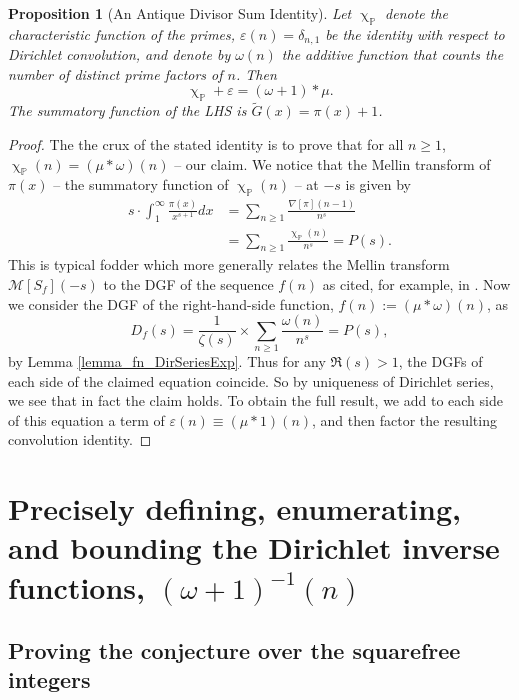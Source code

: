 \documentclass[11pt,reqno,a4letter]{article}
\numberwithin{figure}{section}
\numberwithin{table}{section}
\renewcommand{\chi}{\upchi}
\theoremstyle{plain}
\newtheorem{prop}[theorem]{Proposition}
\numberwithin{theorem}{section}
\theoremstyle{definition}
\begin{document}
\begin{prop}[An Antique Divisor Sum Identity] 
\label{prop_AntiqueDivisorSumIdent} 
Let $\chi_{\mathbb{P}}$ denote the characteristic function of the primes, 
$\varepsilon(n) = \delta_{n,1}$ be the identity with respect to Dirichlet convolution, 
and denote by $\omega(n)$ the additive function that counts the number of 
distinct prime factors of $n$. 
Then 
$$\chi_{\mathbb{P}} + \varepsilon = (\omega + 1) \ast \mu.$$ 
The summatory function of the LHS is $\widetilde{G}(x) = \pi(x)+1$.
\end{prop}
\begin{proof} 
The the crux of the stated identity is to prove that for all $n \geq 1$, 
$\chi_{\mathbb{P}}(n) = (\mu \ast \omega)(n)$ -- our claim. 
We notice that the Mellin transform of $\pi(x)$ -- the summatory function of 
$\chi_{\mathbb{P}}(n)$ -- at $-s$ is given by 
\begin{align*} 
s \cdot \int_1^{\infty} \frac{\pi(x)}{x^{s+1}} dx & = \sum_{n \geq 1} \frac{\nabla[\pi](n-1)}{n^s} \\ 
     & = \sum_{n \geq 1} \frac{\chi_{\mathbb{P}}(n)}{n^s} = P(s). 
\end{align*} 
This is typical fodder which more generally relates the Mellin transform $\mathcal{M}[S_f](-s)$ to the 
DGF of the sequence $f(n)$ as cited, for example, in \cite[\S 11]{APOSTOLANUMT}. Now we consider the 
DGF of the right-hand-side function, $f(n) := (\mu \ast \omega)(n)$, as 
\[
D_f(s) = \frac{1}{\zeta(s)} \times \sum_{n \geq 1} \frac{\omega(n)}{n^s} = P(s),  
\]
by Lemma \ref{lemma_fn_DirSeriesExp}. Thus for any $\Re(s) > 1$, the DGFs of each side of the 
claimed equation coincide. So by uniqueness of Dirichlet series, we see that in fact the claim 
holds. To obtain the full result, we add to each side of this equation a term of 
$\varepsilon(n) \equiv (\mu \ast 1)(n)$, and then factor the resulting convolution identity. 
\end{proof} 

\newpage
\section{Precisely defining, enumerating, and bounding the Dirichlet inverse functions, $(\omega+1)^{-1}(n)$} 

\subsection{Proving the conjecture over the squarefree integers} 
\end{document}
